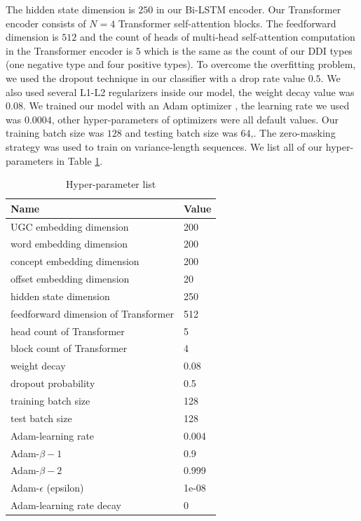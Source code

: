 \documentclass[conference]{IEEEtran}
\begin{document}
The hidden state dimension is $250$ in our Bi-LSTM encoder.
Our Transformer encoder consists of $N=4$ Transformer self-attention blocks.
The feedforward dimension is $512$ and the count of heads of multi-head self-attention computation 
in the Transformer encoder is $5$ which is the same as the count of our DDI types
(one negative type and four positive types).
To overcome the overfitting problem, we used the dropout technique in our classifier with a drop rate value $0.5$.
We also used several L1-L2 regularizers \cite{ng_feature_2004}  inside our model, the weight decay value was $0.08$.
We trained our model with an Adam optimizer \cite{kingma_adam:_2014}, the learning rate we used was $0.0004$, other hyper-parameters of optimizers were all default values. Our training batch size was $128$ and testing batch size was $64$,.
The zero-masking strategy was used to train on variance-length sequences.
We list all of our hyper-parameters in Table \ref{table:hypers}.

\begin{table}
\caption{Hyper-parameter list}
\label{table:hypers}
\centering
\begin{tabular}{ll}
\hline
 Name & Value\\ \hline
UGC embedding dimension & 200\\
 word embedding dimension & 200\\
 concept embedding dimension & 200\\
 offset embedding dimension & 20\\
 hidden state dimension & 250\\
 feedforward dimension of Transformer & 512 \\ 
 head count of Transformer & 5 \\  
 block count of Transformer & 4 \\  
 weight decay & 0.08\\
 dropout probability & 0.5 \\
 training batch size & 128 \\
 test batch size & 128 \\
 Adam-learning rate & 0.004\\
 Adam-$\beta-1$ & 0.9\\
 Adam-$\beta-2$ & 0.999\\
 Adam-$\epsilon$ (epsilon) & 1e-08\\
 Adam-learning rate decay & 0\\
 \hline
\end{tabular}
\end{table}
\end{document}
